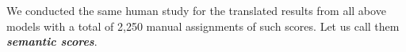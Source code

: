


We conducted the same human study for the translated results from all above models with a total of 2,250 manual assignments of such scores. Let us call them \textbf{{\em
    semantic scores}}.





